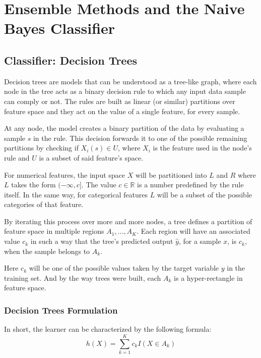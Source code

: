 \chapter{Ensemble Methods and the Naive Bayes Classifier}\label{ch:ensembleMethods}


\section{Classifier: Decision Trees}\label{section:decision_trees}


Decision trees are models that can be understood as a tree-like graph, where each node in the tree acts as a binary decision rule to which any input data sample can comply or not. 
The rules are built as linear (or similar) partitions over feature space and they act on the value of a single feature, for every sample.

At any node, the model creates a binary partition of the data by evaluating a sample $s$ in the rule. 
This decision forwards it to one of the possible remaining partitions by checking if $X_i(s) \in U$, where $X_i$ is the feature used in the node's rule and $U$ is a subset of said feature's space.

For numerical features, the input space $X$ will be partitioned into $L$ and $R$ where $L$ takes the form $(-\infty,c]$. The value $c \in \mathbb{R}$ is a number predefined by the rule itself. 
In the same way, for categorical features $L$ will be a subset of the possible categories of that feature.

By iterating this process over more and more nodes, a tree defines a partition of feature space in multiple regions $A_1,\ldots,A_K$. 
Each region will have an associated value $c_k$ in such a way that the tree's predicted output $\hat{y}$, for a sample $x$, is $c_k$, when the sample belongs to $A_k$. 

Here $c_k$ will be one of the possible values taken by the target variable $y$ in the training set. 
And by the way trees were built, each $A_k$ is a hyper-rectangle in feature space.

\subsection{Decision Trees Formulation}\label{subsection:decision_trees_formulation}
In short, the learner can be characterized by the following formula:
\begin{equation}
h(X) = \sum_{k=1}^K c_k I(X \in A_k)
\end{equation}\label{eq:decisionTreeModel}

